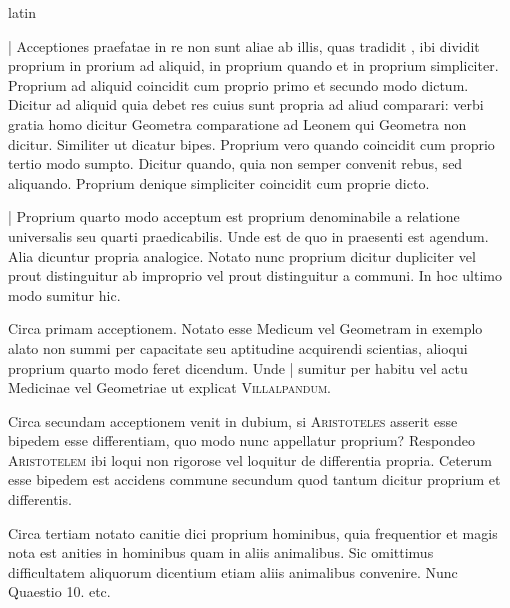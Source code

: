 \begin{otherlanguage*}{latin}
\pstart
{}
\pend

\pstart
\noindent%
\textnormal{|} Acceptiones praefatae in re non sunt aliae ab illis, quas tradidit , ibi dividit proprium in prorium ad aliquid, in proprium quando et in proprium simpliciter. Proprium ad aliquid coincidit cum proprio primo et secundo modo dictum. Dicitur ad aliquid quia debet res cuius sunt propria ad aliud comparari:
verbi gratia homo dicitur Geometra comparatione ad Leonem qui Geometra non dicitur. Similiter ut dicatur bipes. Proprium vero quando coincidit cum proprio tertio modo sumpto. Dicitur quando, quia non semper convenit rebus, sed aliquando. Proprium denique simpliciter coincidit cum proprie dicto. 
\pend

\pstart
\textnormal{|}  Proprium quarto modo acceptum est proprium denominabile a relatione universalis seu quarti praedicabilis. Unde est de quo in praesenti est agendum. Alia dicuntur propria analogice. Notato nunc proprium dicitur dupliciter vel prout distinguitur ab improprio vel prout distinguitur a communi. In hoc ultimo modo sumitur hic. 
\pend

\pstart
Circa primam acceptionem. Notato esse Medicum vel Geometram in exemplo alato non summi per capacitate seu aptitudine acquirendi scientias, alioqui proprium quarto modo feret dicendum. Unde \textnormal{|} sumitur per habitu vel actu Medicinae vel Geometriae ut explicat \textsc{Villalpandum}. 
\pend

\pstart
Circa secundam acceptionem venit in dubium, si \textsc{Aristoteles} asserit esse bipedem esse differentiam, quo modo nunc appellatur proprium? Respondeo \textsc{Aristotelem} ibi loqui non rigorose vel loquitur de differentia propria. Ceterum esse bipedem est accidens commune secundum quod tantum dicitur proprium et differentis. 
\pend

\pstart
Circa tertiam notato canitie dici proprium hominibus, quia frequentior et magis nota est anities in hominibus quam in aliis animalibus. Sic omittimus difficultatem aliquorum dicentium etiam aliis animalibus convenire. Nunc Quaestio 10. etc. 
\pend


\end{otherlanguage*}
